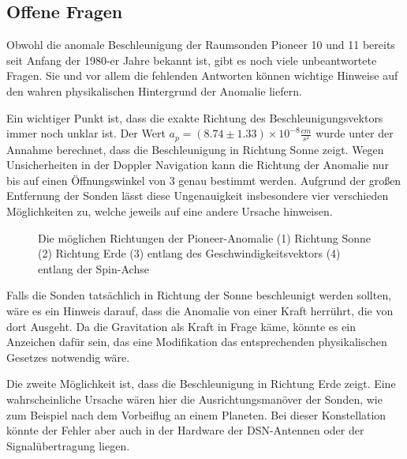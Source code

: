
\subsection{Offene Fragen}

Obwohl die anomale Beschleunigung der Raumsonden Pioneer 10 und 11
bereits seit Anfang der 1980-er Jahre bekannt ist, gibt es noch viele
unbeantwortete Fragen\cite{Turyshev2010}. Sie und vor allem die fehlenden Antworten
k\"onnen wichtige Hinweise auf den wahren physikalischen Hintergrund
der Anomalie liefern.


\bigskip

Ein wichtiger Punkt ist, dass die exakte Richtung des
Beschleunigungsvektors immer noch unklar ist. Der Wert  $a_{p}=(8.74\pm
1.33)\times 10^{-8}\frac{\mathit{cm}}{s^{2}}$ wurde unter der Annahme
berechnet, dass die Beschleunigung in Richtung Sonne zeigt. Wegen
Unsicherheiten in der Doppler Navigation kann die Richtung der Anomalie
nur bis auf einen \"Offnungswinkel von 3{\textordmasculine} genau
bestimmt werden. Aufgrund der gro{\ss}en Entfernung der Sonden l\"asst
diese Ungenauigkeit insbesondere vier verschieden M\"oglichkeiten zu,
welche jeweils auf eine andere Ursache hinweisen.


\begin{figure}[htbn]
\begin{center}
\noindent    
{}
\end{center}
\vskip -10pt
  \caption{Die möglichen Richtungen der Pioneer-Anomalie (1) Richtung Sonne (2) Richtung Erde (3) entlang des Geschwindigkeitsvektors (4) entlang der Spin-Achse\cite{Turyshev2010}}
\label{fig:flugbahn}
\end{figure} 

\bigskip

Falls die Sonden tats\"achlich in Richtung der Sonne beschleunigt werden
sollten, w\"are es ein Hinweis darauf, dass die Anomalie von einer
Kraft herr\"uhrt, die von dort Ausgeht. Da die Gravitation als Kraft in
Frage k\"ame, k\"onnte es ein Anzeichen daf\"ur sein, das eine
Modifikation das entsprechenden physikalischen Gesetzes notwendig
w\"are.


\bigskip

Die zweite M\"oglichkeit ist, dass die Beschleunigung in Richtung Erde
zeigt. Eine wahrscheinliche Ursache w\"aren hier die
Ausrichtungsman\"over der Sonden, wie zum Beispiel nach dem Vorbeiflug
an einem Planeten. Bei dieser Konstellation k\"onnte der Fehler aber
auch in der Hardware der DSN-Antennen oder der Signal\"ubertragung
liegen.


